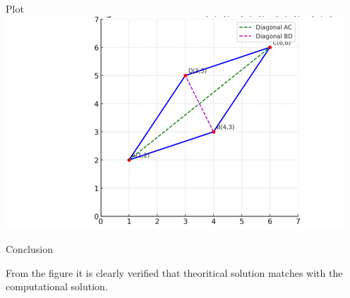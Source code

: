 \documentclass{beamer}
\begin{document}
\begin{frame}{Plot}
    \centering
    \includegraphics[width=\columnwidth, height=0.8\textheight, keepaspectratio]{figs/fig1.png} 
    \label{The visual of the parallelogram with vertices labeled and diagonals shown}
\end{frame}

\begin{frame}{Conclusion}
    

From the figure it is clearly verified that theoritical solution matches with the computational solution.
\end{frame}
\end{document}
